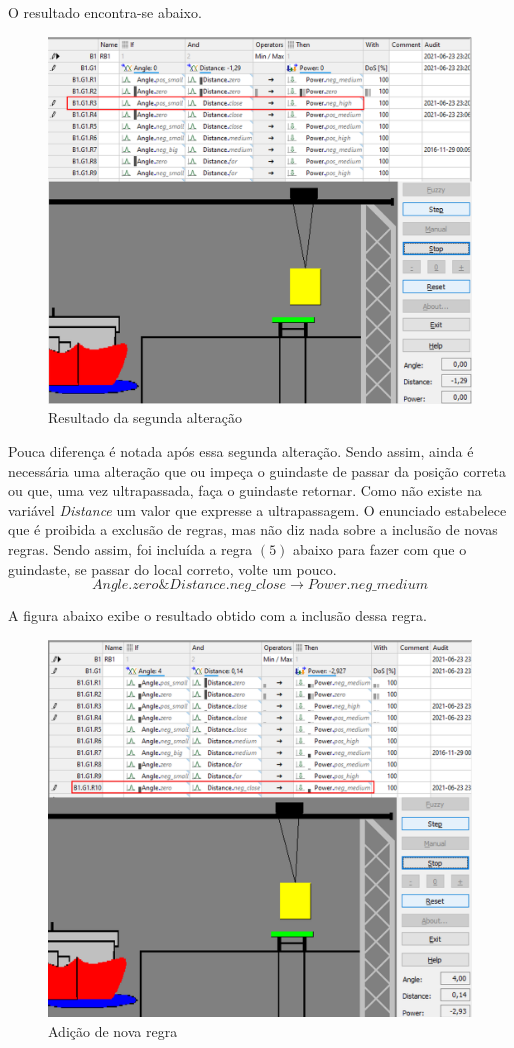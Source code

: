 \documentclass[12pt]{article}
\begin{document}
O resultado encontra-se abaixo.
\begin{figure}[H]
	\centering
	\includegraphics[width=0.7\linewidth]{Imagens/QR1/alteracao2}
	\caption{Resultado da segunda alteração}
	\label{fig:alteracao2}
\end{figure}

Pouca diferença é notada após essa segunda alteração. Sendo assim, ainda é necessária uma alteração que ou impeça o guindaste de passar da posição correta ou que, uma vez ultrapassada, faça o guindaste retornar. Como não existe na variável \textit{Distance} um valor que expresse a ultrapassagem. O enunciado estabelece que é proibida a exclusão de regras, mas não diz nada sobre a inclusão de novas regras. Sendo assim, foi incluída a regra $(5)$ abaixo para fazer com que o guindaste, se passar do local correto, volte um pouco.
\begin{equation}
	Angle.zero\&Distance.neg\_close\to Power.neg\_medium
\end{equation}

A figura abaixo exibe o resultado obtido com a inclusão dessa regra.

\begin{figure}[H]
	\centering
	\includegraphics[width=0.7\linewidth]{Imagens/QR1/novaRegra1}
	\caption{Adição de nova regra}
	\label{fig:novaregra1}
\end{figure}
\end{document}
